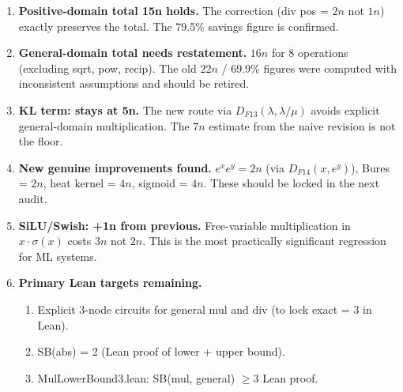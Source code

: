 \documentclass[11pt]{article}
\begin{document}
\begin{enumerate}
  \item \textbf{Positive-domain total 15n holds.}
    The correction (div pos = $2n$ not $1n$) exactly preserves the total.
    The 79.5\% savings figure is confirmed.

  \item \textbf{General-domain total needs restatement.}
    $16n$ for 8 operations (excluding sqrt, pow, recip).
    The old $22n$ / $69.9\%$ figures were computed with inconsistent assumptions and should be retired.

  \item \textbf{KL term: stays at 5n.}
    The new route via $D_{F13}(\lambda, \lambda/\mu)$ avoids explicit general-domain multiplication.
    The $7n$ estimate from the naive revision is not the floor.

  \item \textbf{New genuine improvements found.}
    $e^x e^y = 2n$ (via $D_{F14}(x, e^y)$), Bures = $2n$, heat kernel = $4n$, sigmoid = $4n$.
    These should be locked in the next audit.

  \item \textbf{SiLU/Swish: +1n from previous.}
    Free-variable multiplication in $x \cdot \sigma(x)$ costs $3n$ not $2n$.
    This is the most practically significant regression for ML systems.

  \item \textbf{Primary Lean targets remaining.}
    \begin{enumerate}
      \item Explicit 3-node circuits for general mul and div (to lock exact = 3 in Lean).
      \item SB(abs) = 2 (Lean proof of lower + upper bound).
      \item MulLowerBound3.lean: SB(mul, general) $\geq 3$ Lean proof.
    \end{enumerate}
\end{enumerate}
\end{document}
